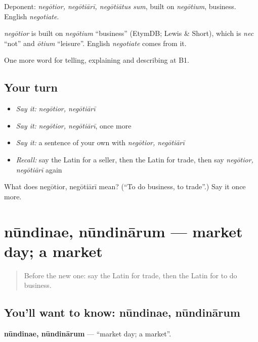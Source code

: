 Deponent: \emph{negōtior, negōtiārī, negōtiātus sum}, built on \emph{negōtium}, business. English \emph{negotiate}.

\begin{cousinweb}
\emph{negōtior} is built on \emph{negōtium} \textquotedblleft{}business\textquotedblright{} (EtymDB; Lewis \& Short), which is \emph{nec} \textquotedblleft{}not\textquotedblright{} and \emph{ōtium} \textquotedblleft{}leisure\textquotedblright{}. English \emph{negotiate} comes from it.
\end{cousinweb}

\begin{grammarlens}[title={What you've built}]
One more word for telling, explaining and describing at B1.
\end{grammarlens}

\subsection*{Your turn}
\begin{itemize}
\raggedright
  \item \emph{Say it:} \emph{negōtior, negōtiārī}
  \item \emph{Say it:} \emph{negōtior, negōtiārī}, once more
  \item \emph{Say it:} a sentence of your own with \emph{negōtior, negōtiārī}
  \item \emph{Recall:} say the Latin for a seller, then the Latin for trade, then say \emph{negōtior, negōtiārī} again
\end{itemize}

\begin{tcolorbox}[breakable,colback=teal!4,colframe=teal!35!black,title={Before you move on}]
What does negōtior, negōtiārī mean? (\textquotedblleft{}To do business, to trade\textquotedblright{}.) Say it once more.
\end{tcolorbox}
\section[nūndinae, nūndinārum]{nūndinae, nūndinārum — market day; a market}

\label{lesson:LA-C421-nundinae}



\begin{quote}
Before the new one: say the Latin for trade, then the Latin for to do business.
\end{quote}

\subsection*{You'll want to know: nūndinae, nūndinārum}
\textbf{nūndinae, nūndinārum} — \textquotedblleft{}market day; a market\textquotedblright{}.

